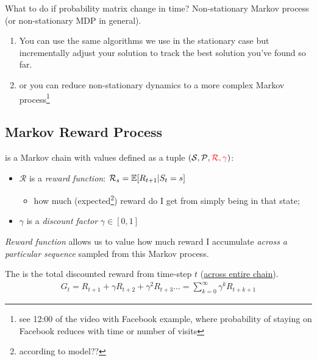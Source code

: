 \begin{notebox}
What to do if probability matrix change in time? Non-stationary Markov process (or non-stationary MDP in general).


\begin{enumerate}
	\item  You can use the same algorithms we use in the stationary case but incrementally adjust your solution to track the best solution you've found so far.
	\item or you can reduce non-stationary dynamics to a more complex Markov process\footnote{see 12:00 of the video with Facebook example, where probability of staying on Facebook reduces with time or number of visits}
\end{enumerate}
\end{notebox}


\subsection{Markov Reward Process}
	
 is a Markov chain with values defined as a tuple $(\mathcal{S}, \mathcal{P}, \textcolor{red}{\mathcal{R}, \mathcal{\gamma}})$:
\begin{itemize}
	\item $\mathcal{R}$ is a \emph{reward function}: $\mathcal{R}_s = \operatorname{\mathbb{E}}[R_{t+1} | S_t = s]$
	\begin{itemize}
		\item how much (expected\footnote{according to model??}) reward do I get from simply being in that state;
	\end{itemize}
	\item $\gamma$ is a \emph{discount factor} $\gamma \in [0, 1]$
\end{itemize}
\emph{Reward function} allows us to value how much reward I accumulate \textit{across a particular sequence} sampled from this Markov process.

The  is the total discounted reward from time-step $t$ (\underline{across entire chain}).
\begin{align}
	G_t = R_{t+1}+ \gamma R_{t+2} + \gamma^2 R_{t+3} ... = \sum_{k=0}^{\infty} \gamma^k R_{t+k+1}
\end{align}

